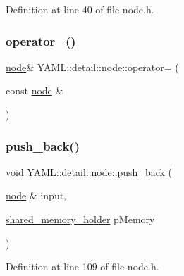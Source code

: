 Definition at line 40 of file node.\+h.

\mbox{\label{class_y_a_m_l_1_1detail_1_1node_a87ad321532ecddcccca9166bc85b325c}} 
\subsubsection{\texorpdfstring{operator=()}{operator=()}}
{\footnotesize\ttfamily \mbox{\hyperlink{class_y_a_m_l_1_1detail_1_1node}{node}}\& Y\+A\+M\+L\+::detail\+::node\+::operator= (\begin{DoxyParamCaption}\item[{const \mbox{\hyperlink{class_y_a_m_l_1_1detail_1_1node}{node}} \&}]{ }\end{DoxyParamCaption})\hspace{0.3cm}{\ttfamily [delete]}}

\mbox{\label{class_y_a_m_l_1_1detail_1_1node_a90d0509a511b4e18c5b48ad162ac4a34}} 
\subsubsection{\texorpdfstring{push\_back()}{push\_back()}}
{\footnotesize\ttfamily \mbox{\hyperlink{glad_8h_a950fc91edb4504f62f1c577bf4727c29}{void}} Y\+A\+M\+L\+::detail\+::node\+::push\+\_\+back (\begin{DoxyParamCaption}\item[{\mbox{\hyperlink{class_y_a_m_l_1_1detail_1_1node}{node}} \&}]{input,  }\item[{\mbox{\hyperlink{namespace_y_a_m_l_1_1detail_a228c4b3b6ba1058b474d40afc218e21d}{shared\+\_\+memory\+\_\+holder}}}]{p\+Memory }\end{DoxyParamCaption})\hspace{0.3cm}{\ttfamily [inline]}}



Definition at line 109 of file node.\+h.

\mbox{\label{class_y_a_m_l_1_1detail_1_1node_ac788238590a4267c01b36497ff5bd6c1}} 
